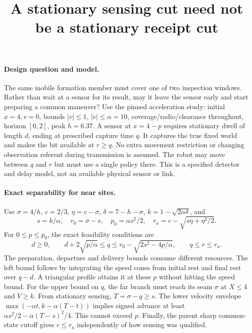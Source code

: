 \documentclass{article}
\begin{document}
\title{A stationary sensing cut need not be a stationary receipt cut}
\maketitle

\paragraph{Design question and model.}
The same mobile formation member must cover one of two inspection
windows. Rather than wait at a sensor for its result, may it leave
the sensor early and start preparing a common maneuver? Use the
pinned acceleration study: initial $x=4,v=0$, bounds $|v|\le1$,
$|\dot v|\le\alpha=10$, coverage/radio/clearance throughout, horizon
$[0,2]$, peak $h=6.37$. A sensor at $x=4-p$ requires stationary
dwell of length $d$, ending at prescribed capture time $q$. It
captures the true fixed world and makes the bit available at $r\ge q$.
No extra movement restriction or changing observation referent during
transmission is assumed. The robot may move between $q$ and $r$
but must use a single policy there. This is a specified detector
and delay model, not an available physical sensor or link.

\paragraph{Exact separability for near sites.}
Use $\sigma=4/h$, $c=2/3$, $\eta=c-\sigma$,
$\delta=7-h-\sigma$, $k=1-\sqrt{2\alpha\delta}$, and
\[
 s=k/\alpha,\quad r_0=\sigma-s,\quad
 p_0=\alpha s^2/2,\quad
 r_a=c-\sqrt{s\eta+\eta^2/2}.
\]
For $0\le p\le p_0$, the exact feasibility conditions are
\[
 d\ge0,\qquad
 d+2\sqrt{p/\alpha}\le q\le r_0-\sqrt{2s^2-4p/\alpha},
 \qquad q\le r\le r_a .
\]
The preparation, departure and delivery bounds consume different
resources. The left bound follows by integrating the speed cones
from initial rest and final rest over $q-d$. A triangular profile
attains it at these $p$ without hitting the speed bound.
For the upper bound on $q$, the far branch must reach its seam
$\sigma$ at $X\le4$ and $V\ge k$. From stationary sensing,
$T=\sigma-q\ge s$. The lower velocity envelope
$\max(-\alpha t,k-\alpha(T-t))$ implies signed advance at least
$\alpha s^2/2-\alpha(T-s)^2/4$. This cannot exceed $p$.
Finally, the parent sharp common-state cutoff gives $r\le r_a$
independently of how sensing was qualified.
\end{document}
